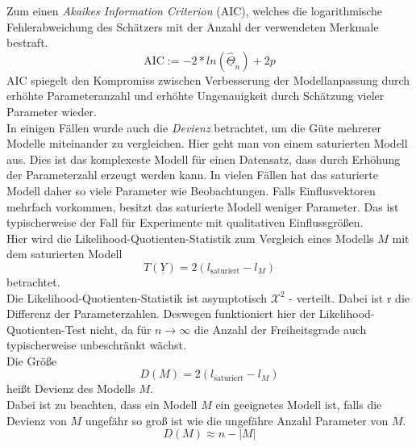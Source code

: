 \noindent
Zum einen \textit{Akaikes Information Criterion} (AIC), welches die logarithmische Fehlerabweichung des Sch\"atzers mit der Anzahl der verwendeten Merkmale bestraft. \\
\begin{equation}
\text{AIC} := -2*ln(\underline{\hat{\Theta}}_n) + 2p
\end{equation}  
AIC spiegelt den Kompromiss zwischen Verbesserung der Modellanpassung durch erhöhte Parameteranzahl und erhöhte Ungenauigkeit durch Schätzung vieler Parameter wieder. \\
In einigen F\"allen wurde auch die \textit{Devienz} betrachtet, um die G\"ute mehrerer Modelle miteinander zu vergleichen.
Hier geht man von einem saturierten Modell aus. Dies ist das komplexeste Modell f\"ur einen Datensatz, dass durch Erh\"ohung der Parameterzahl erzeugt werden kann. In vielen F\"allen hat das saturierte Modell daher so viele Parameter wie Beobachtungen. Falls Einflusvektoren mehrfach vorkommen, besitzt das saturierte Modell weniger Parameter. Das ist typischerweise der Fall f\"ur Experimente mit qualitativen Einflussgr\"o\ss{}en. \\
Hier wird die Likelihood-Quotienten-Statistik zum Vergleich eines Modells $M$ mit dem saturierten Modell 
\begin{equation}
T(\underline{Y}) = 2(l_{\text{saturiert}} - l_M)
\end{equation}
betrachtet. \\
Die Likelihood-Quotienten-Statistik ist asymptotisch  $\mathcal{X}^2$ - verteilt. Dabei ist r die Differenz der Parameterzahlen. Deswegen funktioniert hier der Likelihood-Quotienten-Test nicht, da f\"ur $n \rightarrow \infty$ die Anzahl der Freiheitsgrade auch typischerweise unbeschr\"ankt w\"achst. \\
Die Gr\"o\ss{}e 
\begin{equation}
D(M) = 2(l_{\text{saturiert}} - l_M)
\end{equation}
hei\ss{}t Devienz des Modells $M$. \\
Dabei ist zu beachten, dass ein Modell $M$ ein geeignetes Modell ist, falls die Devienz von $M$ ungef\"ahr so gro\ss{} ist wie die ungef\"ahre Anzahl Parameter von $M$. \\
\begin{equation}
D(M) \approx n - |M|
\end{equation}
\par\medskip

